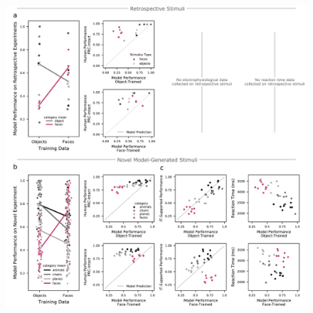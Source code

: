 \documentclass[11pt]{article}
\begin{document}
\begin{figure}[ht]
\centering
\includegraphics[width=.85\linewidth]{figures/training_effects_setup}

\end{figure}
\end{document}
